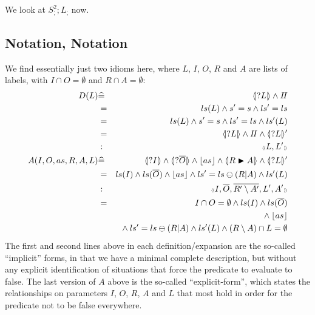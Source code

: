 We look at $S_;^2 ; L_;$ now.

\subsection{Notation, Notation}

We find essentially just two idioms here,
where $L$, $I$, $O$, $R$ and $A$ are lists of labels,
with $I \cap O = \emptyset$ and $R \cap A = \emptyset$:
\begin{eqnarray*}
   D(L) &\defs&  \LS{L} \land \Skip
\\ &=& ls(L) \land s'=s \land ls'=ls
\\ &=& ls(L) \land s'=s \land ls'=ls \land ls'(L)
\\ &=& \LS{L} \land \Skip \land \LSd{L}
\\ &:&  \ltype{L,L'}
\\ A(I,O,as,R,A,L)
   &\defs& \LS{I} \land \LS{\B O}
           \land \ado{as}
           \land \LUPD{R}{A} \land \LSd{L}
\\ &=& ls(I) \land ls(\B O) \land \ado{as}
       \land ls'=ls\ominus(R|A) \land ls'(L)
\\ &:& \ltype{I,\B O,\B{R'\setminus A'},L',A'}
\\ &=& I \cap O = \emptyset \land ls(I) \land ls(\B O)
\\ && {} \land \ado{as}
\\ && {} \land ls'=ls\ominus(R|A) \land ls'(L)
         \land (R\setminus A) \cap L = \emptyset
\end{eqnarray*}
The first and second lines above in each definition/expansion
are the so-called ``implicit'' forms,
in that we have a minimal complete description,
but without any explicit identification of situations that force
the predicate to evaluate to false.
The last version of $A$ above is the so-called ``explicit-form'',
which states the relationships on parameters $I$, $O$, $R$, $A$ and $L$
that most hold in order for the predicate not to be false everywhere.



